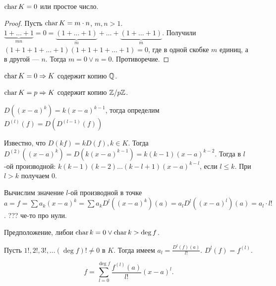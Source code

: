  \begin{lemma}
    $\operatorname{char} K = 0$ или  простое число.
\end{lemma}
\begin{proof}
    Пусть $\operatorname{char} K = m \cdot n$,  $m, n > 1$.  $\underbrace{1+\ldots+1}_{mn} = 0 = \underbrace{(1 + \ldots + 1)}_m + \ldots + \underbrace{(1 + \ldots + 1)}_m$. Получили $(1 + 1 + 1 + \ldots + 1)(1 + 1 + 1 + \ldots + 1) = 0$, где в одной скобке $m$ единиц, а в другой ---  $n$. Тогда  $m = 0 \lor n = 0$. Противоречие.  
\end{proof}
\begin{consequence}
    $\operatorname{char} K = 0 \Rightarrow K$ содержит копию $\mathbb{Q}$.

     $\operatorname{char} K = p \Rightarrow K$ содержит копию  $\mathbb{Z} / p \mathbb{Z}$.
\end{consequence}
$D((x-a)^k) = k (x-a)^{k-1}$, тогда определим  $D^{(l)}(f) = D(D^{(l - 1)}(f))$

Известно, что  $D(kf) = kD(f), k \in K$. Тогда  $D^{(2)}((x-a)^k) = D(k(x-a)^{k-1}) = k(k-1)(x-a)^{k-2}$. Тогда в  $l$-ой производной:  $k(k-1)(k-2)\ldots(k - l + 1)(x-a)^{k-l}$, если $l \le k$. При $l > k$ получаем 0.

Вычислим значение  $l$-ой производной в точке  $a = f = \sum a_k(x-a)^k = \sum a_kD^l((x-a)^k)(a) = a_l D^l((x-a)^l)(a) = a_l \cdot l!$. ??? че-то про нули. 

Предположение, либои  $\operatorname{char} k = 0 \lor \operatorname{char} k > \deg f$.

Пусть  $1!, 2!, 3!, \ldots (\deg f)! \neq 0$ в  $K$. Тогда имеем $a_l = \frac{D^{l}(f)(a)}{l!}$. $D^{l}(f) = f^{(l)}$.
\begin{theorem}
    \[
        f = \sum_{l=0}^{\deg f} \frac{f^{(l)}(a)}{l!}(x-a)^l
    .\] 
\end{theorem}
